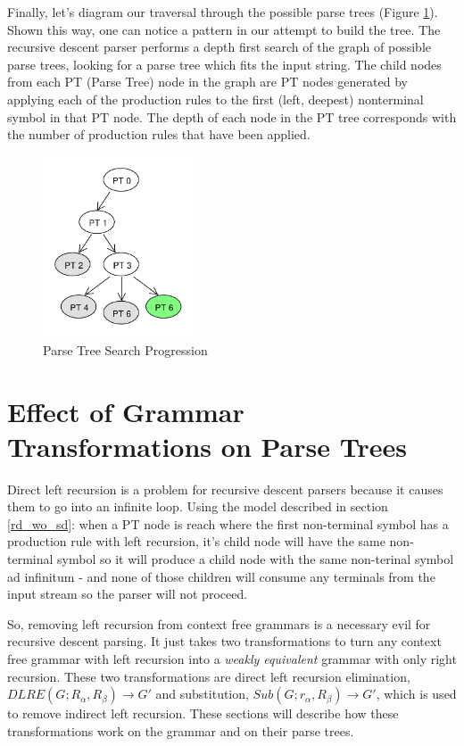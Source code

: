 \documentclass[11pt]{article}
\begin{document}
Finally, let's diagram our traversal through the possible parse trees (Figure \ref{fig:rdp_7}). Shown this way, one can notice
a pattern in our attempt to build the tree. The recursive descent parser performs a depth first search of the 
graph of possible parse trees, looking for a parse tree which fits the input string.
The child nodes from each PT (Parse Tree) node in the graph are PT nodes generated by
applying each of the production rules to the first (left, deepest) nonterminal symbol in that PT node.
The depth of each node in the PT tree corresponds with the number of production rules that have been applied.

\begin{figure}[h!]
    \centering
    \includegraphics[width=0.4\textwidth,natwidth=30,natheight=30]{rdp_7.pdf}
    \caption{Parse Tree Search Progression}
    \label{fig:rdp_7}
\end{figure}

\clearpage

\section{Effect of Grammar Transformations on Parse Trees}
Direct left recursion is a problem for recursive descent parsers because it causes them to
go into an infinite loop. Using the model described in section \ref{rd_wo_sd}:
when a PT node is reach where the first non-terminal symbol has a production rule with
left recursion, it's child node will have the same non-terminal symbol so it will produce
a child node with the same non-terinal symbol ad infinitum - and none of those children will
consume any terminals from the input stream so the parser will not proceed. 

So, removing left recursion from context free grammars is a necessary evil for recursive descent parsing.
It just takes two transformations to turn any context free grammar with left recursion
into a {\em weakly equivalent} grammar with only right recursion.
These two transformations are direct left recursion elimination, 
$DLRE(G; R_\alpha, R_\beta) \rightarrow G'$ and substitution, 
$Sub(G; r_\alpha, R_\beta) \rightarrow G'$, which is used to
remove indirect left recursion. \cite{aho, lewis}
These sections will describe how these transformations work on the grammar
and on their parse trees.
\end{document}
